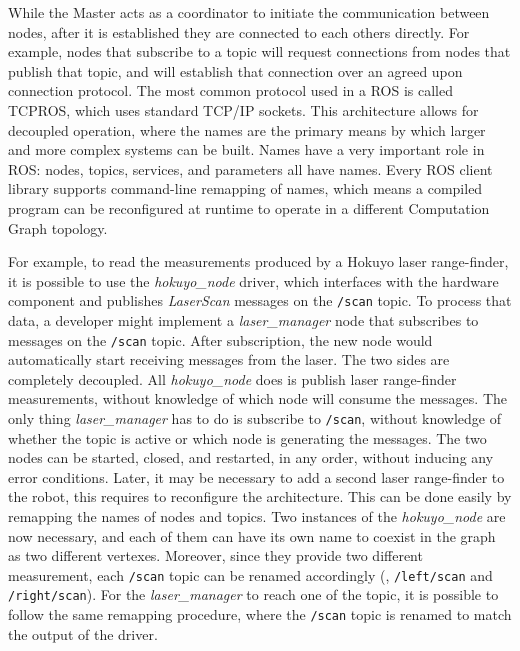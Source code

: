 While the Master acts as a coordinator to initiate the communication between nodes, after it is established they are connected to each others directly. For example, nodes that subscribe to a topic will request connections from nodes that publish that topic, and will establish that connection over an agreed upon connection protocol. The most common protocol used in a ROS is called TCPROS, which uses standard TCP/IP sockets. This architecture allows for decoupled operation, where the names are the primary means by which larger and more complex systems can be built. Names have a very important role in ROS: nodes, topics, services, and parameters all have names. Every ROS client library supports command-line remapping of names, which means a compiled program can be reconfigured at runtime to operate in a different Computation Graph topology.

For example, to read the measurements produced by a Hokuyo laser range-finder, it is possible to use the \textit{hokuyo\_node} driver, which interfaces with the hardware component and publishes \textit{LaserScan} messages on the \texttt{/scan} topic. To process that data, a developer might implement a \textit{laser\_manager} node that subscribes to messages on the \texttt{/scan} topic. After subscription, the new node would automatically start receiving messages from the laser. The two sides are completely decoupled. All \textit{hokuyo\_node} does is publish laser range-finder measurements, without knowledge of which node will consume the messages. The only thing \textit{laser\_ma\-na\-ger} has to do is subscribe to \texttt{/scan}, without knowledge of whether the topic is active or which node is generating the messages. The two nodes can be started, closed, and restarted, in any order, without inducing any error conditions. Later, it may be necessary to add a second laser range-finder to the robot, this requires to reconfigure the architecture. This can be done easily by remapping the names of nodes and topics. Two instances of the \textit{hokuyo\_node} are now necessary, and each of them can have its own name to coexist in the graph as two different vertexes. Moreover, since they provide two different measurement, each \texttt{/scan} topic can be renamed accordingly (\eg, \texttt{/left/scan} and \texttt{/right/scan}). For the \textit{laser\_manager} to reach one of the topic, it is possible to follow the same remapping procedure, where the \texttt{/scan} topic is renamed to match the output of the driver.


